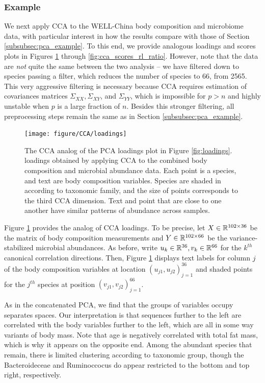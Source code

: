 \documentclass{article}
\begin{document}
\subsubsection{Example}
\label{subsubsec:cca_example}

We next apply CCA to the WELL-China body composition and microbiome data,
with particular interest in how the results compare with those of Section
\ref{subsubsec:pca_example}. To this end, we provide analogous loadings and
scores plots in Figures \ref{fig:cca_loadings} through
\ref{fig:cca_scores_rl_ratio}. However, note that the data are \textit{not}
quite the same between the two analysis -- we have filtered down to species passing
a filter, which reduces the number of species to 66, from 2565. This very
aggressive filtering is necessary because CCA requires estimation of covariances
matrices $\Sigma_{XX}, \Sigma_{XY}$, and $\Sigma_{YY}$, which is impossible for
$p > n$ and highly unstable when $p$ is a large fraction of $n$. Besides this
stronger filtering, all preprocessing steps remain the same as in Section
\ref{subsubsec:pca_example}.

\begin{figure}
  \centering
  \texttt{[image: figure/CCA/loadings]}
  \caption{The CCA analog of the PCA loadings plot in Figure \ref{fig:loadings}.
    loadings obtained by applying CCA to the combined body composition and
    microbial abundance data. Each point is a species, and text are body
    composition variables. Species are shaded in according to taxonomic family,
    and the size of points corresponds to the third CCA dimension. Text and
    point that are close to one another have similar patterns of abundance
    across samples.
      \label{fig:cca_loadings} }
\end{figure}

Figure \ref{fig:cca_loadings} provides the analog of CCA loadings. To be
precise, let $X \in \mathbb{R}^{102\times 36}$ be the matrix of body composition
measurements and $Y \in \mathbb{R}^{102 \times 66}$ be the variance-stabilized
microbial abundances. As before, write $u_{k} \in \mathbb{R}^{36}, v_{k} \in
\mathbb{R}^{66}$ for the $k^{th}$ canonical correlation directions. Then, Figure
\ref{fig:cca_loadings} displays text labels for column $j$ of the body
composition variables at location $\left(u_{j1}, u_{j2}\right)_{j = 1}^{36}$ and
shaded points for the $j^{th}$ species at position $\left(v_{j1},
v_{j2}\right)_{j = 1}^{66}$.

As in the concatenated PCA, we find that the groups of variables occupy
separates spaces. Our interpretation is that sequences further to the left are
correlated with the body variables further to the left, which are all in some
way variants of body mass. Note that age is negatively correlated with total fat
mass, which is why it appears on the opposite end. Among the abundant species
that remain, there is limited clustering according to taxonomic group, though
the Bacteroideceae and Ruminoccocus do appear restricted to the bottom and top
right, respectively.
\end{document}
